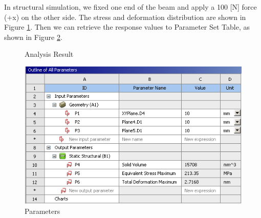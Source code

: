 \documentclass[12pt]{kjleehw}
\begin{document}
\begin{CJK}{UTF8}{bkai}
In structural simulation, we fixed one end of the beam and apply a 100 [N] force (+x) on the other side. The stress and deformation distribution are shown in Figure \ref{fig:anslysis}. Then we can retrieve the response values to Parameter Set Table, as shown in Figure \ref{fig:parameters}.

\newpage

\begin{figure}[h]
	\centering
  \caption{Analysis Result}
  \label{fig:anslysis}
\end{figure}

\begin{figure}[h]
	\centering
	\includegraphics[scale=0.65]{figure/parameters.png}
	\caption{Parameters}
	\label{fig:parameters}
\end{figure}


\end{CJK}
\end{document}
